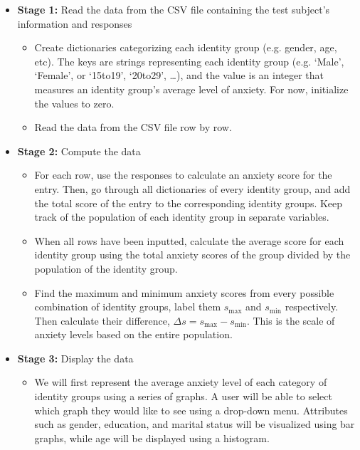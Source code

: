 \documentclass[fontsize=11pt]{article}
\begin{document}
    \begin{itemize}
        \item \textbf{Stage 1:} Read the data from the CSV file containing the test subject’s information and responses

        \begin{itemize}
            \item Create dictionaries categorizing each identity group (e.g. gender, age, etc). The keys are strings representing each identity group (e.g. `Male’, `Female’, or `15to19’, `20to29’, \dots), and the value is an integer that measures an identity group’s average level of anxiety. For now, initialize the values to zero.

            \item Read the data from the CSV file row by row.
        \end{itemize}

        \item \textbf{Stage 2:} Compute the data

        \begin{itemize}
            \item For each row, use the responses to calculate an anxiety score for the entry. Then, go through all dictionaries of every identity group, and add the total score of the entry to the corresponding identity groups. Keep track of the population of each identity group in separate variables.

            \item When all rows have been inputted, calculate the average score for each identity group using the total anxiety scores of the group divided by the population of the identity group.

            \item Find the maximum and minimum anxiety scores from every possible combination of identity groups, label them $s_{\mathrm{max}}$ and $s_{\mathrm{min}}$ respectively. Then calculate their difference, $\Delta s = s_{\mathrm{max}} - s_{\mathrm{min}}$. This is the scale of anxiety levels based on the entire population.
        \end{itemize}

        \item \textbf{Stage 3:} Display the data

        \begin{itemize}
            \item We will first represent the average anxiety level of each category of identity groups using a series of graphs. A user will be able to select which graph they would like to see using a drop-down menu. Attributes such as gender, education, and marital status will be visualized using bar graphs, while age will be displayed using a histogram.


\end{itemize}
\end{itemize}
\end{document}
